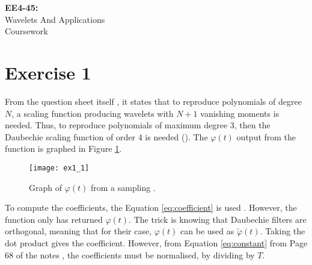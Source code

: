 \documentclass[11pt,a4paper]{report}
\newcommand{\mychapter}[2]
{
    \setcounter{chapter}{#1}
    \setcounter{section}{0}
    \chapter*{#2}
    \addcontentsline{toc}{chapter}{#2}
}
\begin{document}
\begin{titlepage}
\vspace*{\fill}

\begin{center}

\Huge{\textbf{EE4-45:}\\ Wavelets And Applications}\\
\vspace{1cm}
\Huge{Coursework}

\end{center}

\vspace*{\fill}

\end{titlepage}

\tableofcontents
\newpage

\mychapter{1}{Exercise 1}

\setcounter{page}{1}

From the question sheet itself \cite{question}, it states that to reproduce polynomials of degree $N$, a scaling function producing wavelets with $N+1$ vanishing moments is needed. Thus, to reproduce polynomials of maximum degree 3, then the Daubechie scaling function of order 4 is needed (). The $\varphi({t})$ output from the  function is graphed in Figure \ref{fig:e1_1}.

\begin{figure}[!ht]
    \centering
    \texttt{[image: ex1\_1]}
    \caption{Graph of $\varphi({t})$ from a sampling .}
    \label{fig:e1_1}
\end{figure}

To compute the coefficients, the Equation \ref{eq:coefficient} is used \cite{question}. However, the function  only has returned $\varphi(t)$. The trick is knowing that Daubechie filters are orthogonal, meaning that for their case, $\varphi(t)$ can be used as $\tilde{\varphi}(t)$. Taking the dot product gives the coefficient. However, from Equation \ref{eq:constant} from Page 68 of the notes \cite{notes}, the coefficients must be normalised, by dividing by $T$.
\end{document}
